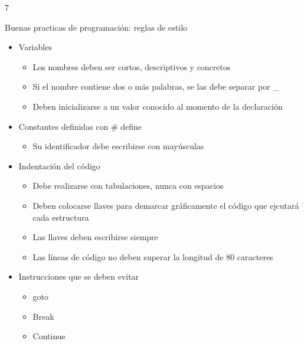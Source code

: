 7\documentclass[xcolor=pdftex,table,11pt]{beamer}
\begin{document}
\begin{frame}{Buenas practicas de programación: reglas de estilo}
\begin{itemize}
\item<1-> Variables 
	\begin{itemize}
		\item<2-> Los nombres deben ser cortos, descriptivos y concretos
		\item<3-> Si el nombre contiene dos o más palabras, se las debe separar por \_
		\item<4-> Deben inicializarse a un valor conocido al momento de la declaración
	\end{itemize}
	
\item<5-> Constantes definidas con \# define 
	\begin{itemize}
		\item<6-> Su identificador debe escribirse con mayúsculas
	\end{itemize}



\item<7-> Indentación del código
	\begin{itemize}
		\item<8-> Debe realizarse con tabulaciones, nunca con espacios
		\item<9-> Deben colocarse llaves para demarcar gráficamente el código que ejcutará cada estructura

		\item<10-> Las llaves deben escribirse siempre
		
		\item<11-> Las líneas de código no deben superar la longitud de 80 caracteres

		
	\end{itemize}

\item<12-> Instrucciones que se deben evitar
	\begin{itemize}
		\item<13-> goto
		\item<14-> Break
		\item<15-> Continue

		
	\end{itemize}

\end{itemize}

    
\end{frame}
\end{document}
